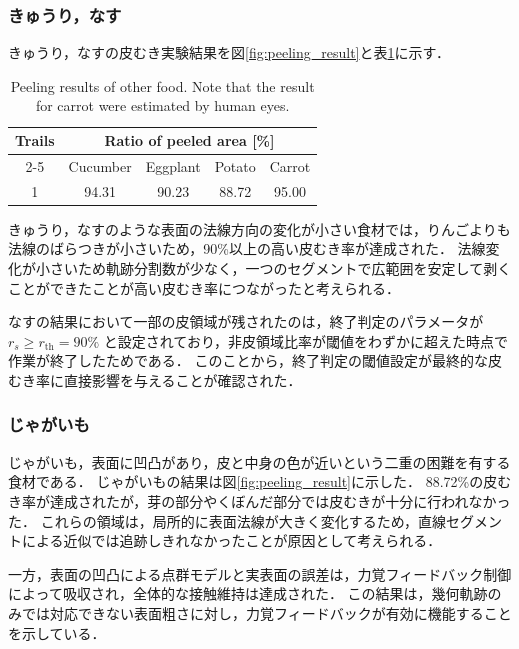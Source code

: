 \subsubsection{きゅうり，なす}

きゅうり，なすの皮むき実験結果を図\ref{fig:peeling_result}と表\ref{tab:peeling_others-result}に示す．

\begin{table}[t]
\centering
\caption{Peeling results of other food. Note that the result for carrot were estimated by human eyes.}
\begin{tabular}{ccccc}
	\hline
	\multirow{2}{*}{Trails} & \multicolumn{4}{c}{Ratio of peeled area {[}\%{]}} \\ \cline{2-5} 
	& Cucumber    & Eggplant    & Potato    & Carrot    \\ \hline
	1                       & 94.31       & 90.23       & 88.72     & 95.00     \\ \hline
\end{tabular}
\label{tab:peeling_others-result}
\end{table}

きゅうり，なすのような表面の法線方向の変化が小さい食材では，りんごよりも法線のばらつきが小さいため，90\%以上の高い皮むき率が達成された．
法線変化が小さいため軌跡分割数が少なく，一つのセグメントで広範囲を安定して剥くことができたことが高い皮むき率につながったと考えられる．

なすの結果において一部の皮領域が残されたのは，終了判定のパラメータが $r_s \ge r_{\mathrm{th}} = 90\%$ と設定されており，非皮領域比率が閾値をわずかに超えた時点で作業が終了したためである．
このことから，終了判定の閾値設定が最終的な皮むき率に直接影響を与えることが確認された．

\subsubsection{じゃがいも}

じゃがいも，表面に凹凸があり，皮と中身の色が近いという二重の困難を有する食材である．
じゃがいもの結果は図\ref{fig:peeling_result}に示した．
88.72\%の皮むき率が達成されたが，芽の部分やくぼんだ部分では皮むきが十分に行われなかった．
これらの領域は，局所的に表面法線が大きく変化するため，直線セグメントによる近似では追跡しきれなかったことが原因として考えられる．

一方，表面の凹凸による点群モデルと実表面の誤差は，力覚フィードバック制御によって吸収され，全体的な接触維持は達成された．
この結果は，幾何軌跡のみでは対応できない表面粗さに対し，力覚フィードバックが有効に機能することを示している．

